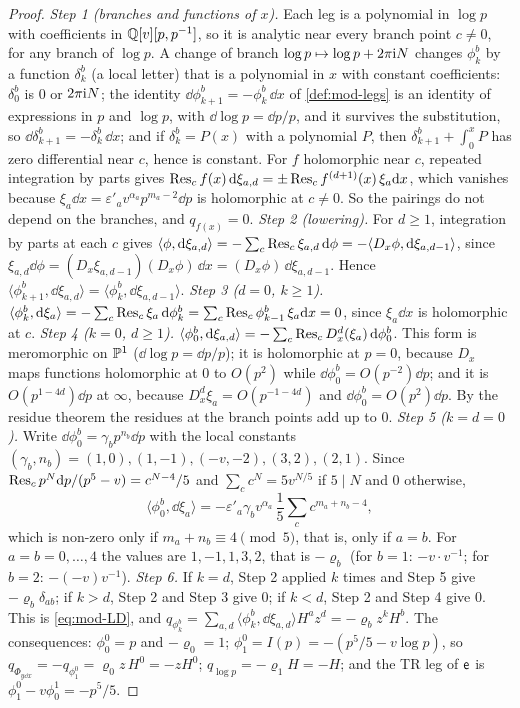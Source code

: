 \begin{proof}
\emph{Step 1 (branches and functions of $x$).} Each leg is a polynomial in $\log p$ with coefficients in $\mathbb{Q}[v][p,p^{-1}]$, so it is analytic near every branch point $c\neq 0$, for any branch of $\log p$. A change of branch $\log p\mapsto\log p+2\pi\mathrm{i} N$ changes $\phi^b_k$ by a function $\delta^b_k$ (a local letter) that is a polynomial in $x$ with constant coefficients: $\delta^b_0$ is $0$ or $2\pi\mathrm{i} N$; the identity $\dd\phi^b_{k+1}=-\phi^b_k\,\dd x$ of \cref{def:mod-legs} is an identity of expressions in $p$ and $\log p$, with $\dd\log p=\dd p/p$, and it survives the substitution, so $\dd\delta^b_{k+1}=-\delta^b_k\,\dd x$; and if $\delta^b_k=P(x)$ with a polynomial $P$, then $\delta^b_{k+1}+\int_0^xP$ has zero differential near $c$, hence is constant. For $f$ holomorphic near $c$, repeated integration by parts gives $\operatorname*{Res}_cf(x)\,\mathrm{d}\xi_{a,d}=\pm\operatorname*{Res}_cf^{(d+1)}(x)\,\xi_a\mathrm{d} x$, which vanishes because $\xi_a\dd x=\varepsilon'_av^{\alpha_a}p^{m_a-2}\dd p$ is holomorphic at $c\neq 0$. So the pairings do not depend on the branches, and $q_{f(x)}=0$.
\emph{Step 2 (lowering).} For $d\geq 1$, integration by parts at each $c$ gives $\langle\phi,\mathrm{d}\xi_{a,d}\rangle=-\sum_c\operatorname*{Res}_c\xi_{a,d}\,\mathrm{d}\phi=-\langle D_x\phi,\mathrm{d}\xi_{a,d-1}\rangle$, since $\xi_{a,d}\dd\phi=(D_x\xi_{a,d-1})(D_x\phi)\,\dd x=(D_x\phi)\,\dd\xi_{a,d-1}$. Hence $\langle\phi^b_{k+1},\dd\xi_{a,d}\rangle=\langle\phi^b_k,\dd\xi_{a,d-1}\rangle$.
\emph{Step 3 ($d=0$, $k\geq 1$).} $\langle\phi^b_k,\mathrm{d}\xi_a\rangle=-\sum_c\operatorname*{Res}_c\xi_a\,\mathrm{d}\phi^b_k=\sum_c\operatorname*{Res}_c\phi^b_{k-1}\,\xi_a\mathrm{d} x=0$, since $\xi_a\dd x$ is holomorphic at $c$.
\emph{Step 4 ($k=0$, $d\geq 1$).} $\langle\phi^b_0,\mathrm{d}\xi_{a,d}\rangle=-\sum_c\operatorname*{Res}_cD_x^d(\xi_a)\,\mathrm{d}\phi^b_0$. This form is meromorphic on $\mathbb{P}^1$ ($\dd\log p=\dd p/p$); it is holomorphic at $p=0$, because $D_x$ maps functions holomorphic at $0$ to $O(p^2)$ while $\dd\phi^b_0=O(p^{-2})\dd p$; and it is $O(p^{1-4d})\dd p$ at $\infty$, because $D_x^d\xi_a=O(p^{-1-4d})$ and $\dd\phi^b_0=O(p^2)\dd p$. By the residue theorem the residues at the branch points add up to $0$.
\emph{Step 5 ($k=d=0$).} Write $\dd\phi^b_0=\gamma_bp^{n_b}\dd p$ with the local constants $(\gamma_b,n_b)=(1,0),(1,-1),(-v,-2),(3,2),(2,1)$. Since $\operatorname*{Res}_cp^N\mathrm{d} p/(p^5-v)=c^{N-4}/5$ and $\sum_cc^N=5v^{N/5}$ if $5\mid N$ and $0$ otherwise,
\[
\langle\phi^b_0,\dd\xi_a\rangle=-\varepsilon'_a\gamma_bv^{\alpha_a}\,\frac15\sum_cc^{m_a+n_b-4},
\]
which is non-zero only if $m_a+n_b\equiv 4\pmod 5$, that is, only if $a=b$. For $a=b=0,\dots,4$ the values are $1,-1,1,3,2$, that is $-\varrho_b$ (for $b=1$: $-v\cdot v^{-1}$; for $b=2$: $-(-v)v^{-1}$).
\emph{Step 6.} If $k=d$, Step 2 applied $k$ times and Step 5 give $-\varrho_b\delta_{ab}$; if $k>d$, Step 2 and Step 3 give $0$; if $k<d$, Step 2 and Step 4 give $0$. This is \eqref{eq:mod-LD}, and $q_{\phi^b_k}=\sum_{a,d}\langle\phi^b_k,\dd\xi_{a,d}\rangle H^az^d=-\varrho_bz^kH^b$. The consequences: $\phi^0_0=p$ and $-\varrho_0=1$; $\phi^0_1=I(p)=-(p^5/5-v\log p)$, so $q_{\Phi_{y\dd x}}=-q_{\phi^0_1}=\varrho_0z\,H^0=-zH^0$; $q_{\log p}=-\varrho_1H=-H$; and the TR leg of $\mathsf{e}$ is $\phi^0_1-v\phi^1_0=-p^5/5$.
\end{proof}

